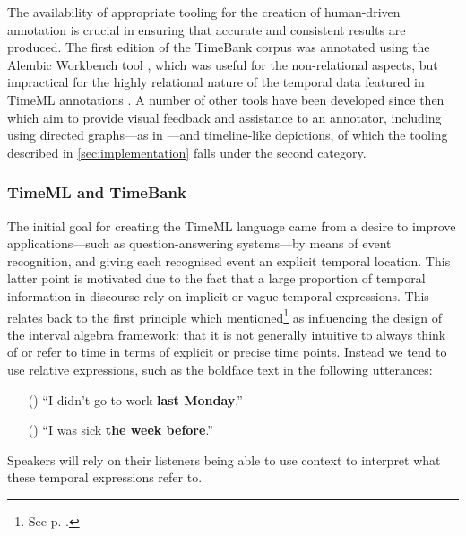\documentclass[a4paper,12pt,leqno,twoside]{article}
\newcommand{\ipp}{(\refstepcounter{equation}\theequation)}
\begin{document}
The availability of appropriate tooling for the creation of human-driven annotation is crucial in ensuring that accurate and consistent results are produced. The first edition of the TimeBank corpus was annotated using the Alembic Workbench tool \citep{day1997mixed}, which was useful for the non-relational aspects, but impractical for the highly relational nature of the temporal data featured in TimeML annotations \citep{verhagen2005TBOX}. A number of other tools have been developed since then which aim to provide visual feedback and assistance to an annotator, including using directed graphs---as in \citet{allen1983maintaining}---and timeline-like depictions, of which the tooling described in \cref{sec:implementation} falls under the second category.

\subsubsection{TimeML and TimeBank}\label{ssub:timeml}
The initial goal for creating the TimeML language came from a desire to improve applications\allowbreak{}---such as question-answering systems---by means of event recognition, and giving each recognised event an explicit temporal location. This latter point is motivated due to the fact that a large proportion of temporal information in discourse rely on implicit or vague temporal expressions. This relates back to the first principle which \citet{allen1983maintaining} mentioned\footnote{See p. \pageref{other:allen-motivations}.} as influencing the design of the interval algebra framework: that it is not generally intuitive to always think of or refer to time in terms of explicit or precise time points. Instead we tend to use relative expressions, such as the boldface text in the following utterances:
\begin{itemize}
	\item[\ipp] ``I didn't go to work \textbf{last Monday}.''
	\item[\ipp] ``I was sick \textbf{the week before}.''
\end{itemize}
Speakers will rely on their listeners being able to use context to interpret what these temporal expressions refer to.
\end{document}
